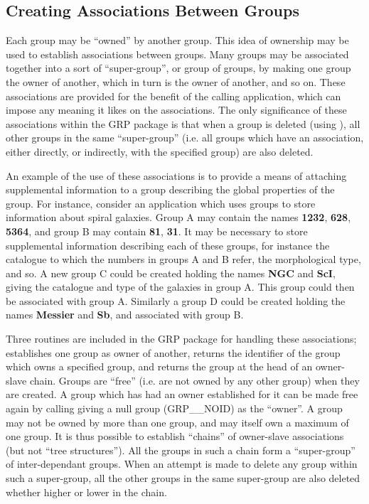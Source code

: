 \subsection{\label{SEC:OWN}Creating Associations Between Groups}

Each group may be ``owned'' by another group. This idea of ownership may be
used to
establish associations between groups. Many groups may be associated together
into a sort of ``super-group'', or group of groups, by making one group the
owner of another, which in turn is the owner of another, and so on. These
associations are provided for the benefit of the calling application, which can
impose any meaning it likes on the associations. The only significance of these
associations within the GRP package is that when a group is deleted (using
), all other groups in the same ``super-group'' (i.e. all groups which
have an association, either directly, or indirectly, with the specified group)
are also deleted.

An example of the use of these associations is to provide a means of attaching
supplemental information to a group describing the global properties of the
group. For instance, consider an application which uses groups to store
information about spiral galaxies. Group A may contain the names {\bf 1232},
{\bf 628}, {\bf 5364}, and group B may contain {\bf 81}, {\bf 31}. It may be
necessary to store supplemental information describing each of these groups, for
instance the catalogue to which the numbers in groups A and B refer, the
morphological type, and so. A new group C could be created holding the names
{\bf NGC} and {\bf ScI}, giving the catalogue and type of the galaxies in group
A. This group could then be associated with group A. Similarly a group D could
be created holding the names {\bf Messier} and {\bf Sb}, and associated with
group B.

Three routines are included in the GRP package for handling these associations;
 establishes one group as owner of another,  returns the
identifier of the group which owns a specified group, and  returns the
group at the head of an owner-slave chain. Groups are ``free'' (i.e. are not
owned by any other group) when they are created. A group which has had an owner
established for it can be made free again by calling  giving a null
group (GRP\_\_NOID) as the ``owner''. A group may not be owned by more than one
group, and may itself own a maximum of one group. It is thus possible to
establish ``chains'' of owner-slave associations (but not ``tree structures'').
All the groups in such a chain form a ``super-group'' of inter-dependant groups.
When an attempt is made to delete any group within such a super-group, all the
other groups in the same super-group are also deleted whether higher or lower in
the chain.

